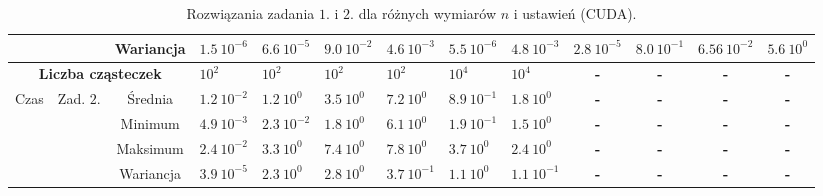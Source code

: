 \documentclass[11pt, a4paper, oneside]{article}
\begin{document}
\begin{table}[H]
\begin{adjustwidth}{-1.76cm}{}
\begin{tabular}{|c|c|c|l|l|l|l|l|l|c|c|c|c|}
                      &                            & Wariancja & $1.5 \ 10^{-6}$          & $6.6 \ 10^{-5}$         & $9.0 \ 10^{-2}$          & $4.6 \ 10^{-3}$         & $5.5 \ 10^{-6}$          & $4.8 \ 10^{-3}$         & \multicolumn{1}{l|}{$2.8 \ 10^{-5}$}   & \multicolumn{1}{l|}{$8.0 \ 10^{-1}$}   & \multicolumn{1}{l|}{$6.56 \ 10^{-2}$}  & \multicolumn{1}{l|}{$5.6 \ 10^{0}$}    \\ \hline
\multicolumn{3}{|c|}{\textbf{Liczba cząsteczek}}               & \textbf{$10^{2}$}        & \textbf{$10^{2}$}       & \textbf{$10^{2}$}        & \textbf{$10^{2}$}       & \textbf{$10^{4}$}        & \textbf{$10^{4}$}       & \textbf{-}                             & \textbf{-}                             & \textbf{-}                             & \textbf{-}                             \\ \hline
\multirow{4}{*}{Czas} & Zad. $2$.                  & Średnia   & $1.2 \ 10^{-2}$          & $1.2 \ 10^{0}$          & $3.5 \ 10^{0}$           & $7.2 \ 10^{0}$          & $8.9 \ 10^{-1}$          & $1.8 \ 10^{0}$          & \textbf{-}                             & \textbf{-}                             & \textbf{-}                             & \textbf{-}                             \\ \cline{3-13} 
                      &                            & Minimum   & $4.9 \ 10^{-3}$          & $2.3 \ 10^{-2}$         & $1.8 \ 10^{0}$           & $6.1 \ 10^{0}$          & $1.9 \ 10^{-1}$          & $1.5 \ 10^{0}$          & \textbf{-}                             & \textbf{-}                             & \textbf{-}                             & \textbf{-}                             \\ \cline{3-13} 
                      &                            & Maksimum  & $2.4 \ 10^{-2}$          & $3.3 \ 10^{0}$          & $7.4 \ 10^{0}$           & $7.8 \ 10^{0}$          & $3.7 \ 10^{0}$           & $2.4 \ 10^{0}$          & \textbf{-}                             & \textbf{-}                             & \textbf{-}                             & \textbf{-}                             \\ \cline{3-13} 
                      &                            & Wariancja & $3.9 \ 10^{-5}$          & $2.3 \ 10^{0}$          & $2.8 \ 10^{0}$           & $3.7 \ 10^{-1}$         & $1.1 \ 10^{0}$           & $1.1 \ 10^{-1}$         & \textbf{-}                             & \textbf{-}                             & \textbf{-}                             & \textbf{-}                             \\ \hline
\end{tabular}
\end{adjustwidth}
\caption{Rozwiązania zadania $1$. i $2$. dla różnych wymiarów $n$ i ustawień (CUDA).}
\label{tab:CUDA}
\end{table}
\end{document}
